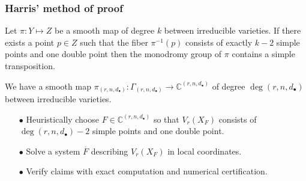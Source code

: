 \documentclass{beamer}
\theoremstyle{definition}
\begin{document}
\begin{frame}
\frametitle{Harris' method of proof}


\begin{lemma}[Harris]

\vspace{.05cm}

Let $\pi:Y\mapsto Z$ be a smooth map of degree $k$ between irreducible varieties. If there exists a point $p\in Z$ such that the fiber $\pi^{-1}(p)$ consists of exactly $k-2$ simple points and one double point then the monodromy group of $\pi$ contains a simple transposition.
\end{lemma}

\vspace{.2cm}

We have a smooth map $\pi_{(r,n,d_\bullet)}:\Gamma_{(r,n,d_\bullet)}\to\mathbb{C}^{(r,n,d_\bullet)}$ of degree $\deg(r,n,d_\bullet)$ between irreducible varieties.
\begin{enumerate}
\item[$\bullet$] Heuristically choose $F\in\mathbb{C}^{(r,n,d_\bullet)}$ so that $V_r(X_F)$ consists of $\deg(r,n,d_\bullet)-2$ simple points and one double point.

\item[$\bullet$] Solve a system $\overline{F}$ describing $V_r(X_F)$ in local coordinates.

\item[$\bullet$] Verify claims with exact computation and numerical certification.
\end{enumerate}
\end{frame}
\end{document}
